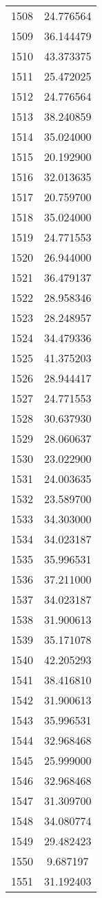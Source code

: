 \documentclass[12pt]{article}
\begin{document}
\begin{longtable}{@{}cc@{}}
1508 & 24.776564 \\
1509 & 36.144479 \\
1510 & 43.373375 \\
1511 & 25.472025 \\
1512 & 24.776564 \\
1513 & 38.240859 \\
1514 & 35.024000 \\
1515 & 20.192900 \\
1516 & 32.013635 \\
1517 & 20.759700 \\
1518 & 35.024000 \\
1519 & 24.771553 \\
1520 & 26.944000 \\
1521 & 36.479137 \\
1522 & 28.958346 \\
1523 & 28.248957 \\
1524 & 34.479336 \\
1525 & 41.375203 \\
1526 & 28.944417 \\
1527 & 24.771553 \\
1528 & 30.637930 \\
1529 & 28.060637 \\
1530 & 23.022900 \\
1531 & 24.003635 \\
1532 & 23.589700 \\
1533 & 34.303000 \\
1534 & 34.023187 \\
1535 & 35.996531 \\
1536 & 37.211000 \\
1537 & 34.023187 \\
1538 & 31.900613 \\
1539 & 35.171078 \\
1540 & 42.205293 \\
1541 & 38.416810 \\
1542 & 31.900613 \\
1543 & 35.996531 \\
1544 & 32.968468 \\
1545 & 25.999000 \\
1546 & 32.968468 \\
1547 & 31.309700 \\
1548 & 34.080774 \\
1549 & 29.482423 \\
1550 & 9.687197 \\
1551 & 31.192403 \\

\end{longtable}
\end{document}
